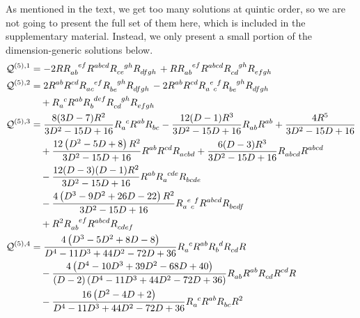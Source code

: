 \documentclass[a4paper,11pt]{article}
\begin{document}
As mentioned in the text, we get too many solutions at quintic order, so we are not going to present the full set of them here, which is included in the supplementary material. Instead, we only present a small portion of the dimension-generic solutions below.
\begin{subequations}\label{eq:quintic-qtgs}
    \begin{align}
        \mathcal Q^{(5), 1} & = -2 RR\indices{_a_b^e^f}R\indices{^a^b^c^d}R\indices{_c_e^g^h}R\indices{_d_f_g_h}+RR\indices{_a_b^e^f}R\indices{^a^b^c^d}R\indices{_c_d^g^h}R\indices{_e_f_g_h}\label{eq:quintic-qtg-1} \\
        \mathcal Q^{(5), 2} & = 2R\indices{^a^b}R\indices{^c^d}R\indices{_a_c^e^f}R\indices{_b_e^g^h}R\indices{_d_f_g_h}-2R\indices{^a^b}R\indices{^c^d}R\indices{_a^e_c^f}R\indices{_b_e^g^h}R\indices{_d_f_g_h}\nonumber\\
        &\quad+R\indices{_a^c}R\indices{^a^b}R\indices{_b^d^e^f}R\indices{_c_d^g^h}R\indices{_e_f_g_h} \label{eq:quintic-qtg-2}\\
        \mathcal Q^{(5), 3} & = \frac{8 (3 D-7) R^2}{3 D^2-15 D+16}R\indices{_a^c}R\indices{^a^b}R\indices{_b_c}-\frac{12 (D-1) R^3}{3 D^2-15 D+16}R\indices{_a_b}R\indices{^a^b}+\frac{4 R^5}{3 D^2-15 D+16}\nonumber\\
        & \quad + \frac{12 \left(D^2-5 D+8\right) R^2}{3 D^2-15 D+16}R\indices{^a^b}R\indices{^c^d}R\indices{_a_c_b_d}+\frac{6 (D-3) R^3}{3 D^2-15 D+16}R\indices{_a_b_c_d}R\indices{^a^b^c^d}\nonumber\\
        & \quad -\frac{12 (D-3) (D-1) R^2}{3 D^2-15 D+16}R\indices{^a^b}R\indices{_a^c^d^e}R\indices{_b_c_d_e}\nonumber\\
        &\quad-\frac{4 \left(D^3-9 D^2+26 D-22\right) R^2}{3 D^2-15 D+16}R\indices{_a^e_c^f}R\indices{^a^b^c^d}R\indices{_b_e_d_f}\nonumber\\
        & \quad +R^2R\indices{_a_b^e^f}R\indices{^a^b^c^d}R\indices{_c_d_e_f}\label{eq:quintic-qtg-3} \\
        \mathcal Q^{(5), 4} & = \frac{4 \left(D^3-5 D^2+8 D-8\right)}{D^4-11 D^3+44 D^2-72 D+36}R\indices{_a^c}R\indices{^a^b}R\indices{_b^d}R\indices{_c_d}R\nonumber\\
        & \quad -\frac{4 \left(D^4-10 D^3+39 D^2-68 D+40\right)}{(D-2) \left(D^4-11 D^3+44 D^2-72 D+36\right)}R\indices{_a_b}R\indices{^a^b}R\indices{_c_d}R\indices{^c^d}R\nonumber\\
        & \quad -\frac{16 \left(D^2-4 D+2\right)}{D^4-11 D^3+44 D^2-72 D+36}R\indices{_a^c}R\indices{^a^b}R\indices{_b_c}R^2\nonumber\\

\end{align}
\end{subequations}
\end{document}
